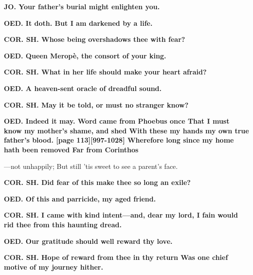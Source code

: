 \documentclass[11pt,letter]{book}
\begin{document}
\par \textbf{JO. Your father’s burial might enlighten you.}
\par 

\par \textbf{OED. It doth. But I am darkened by a life.}
\par 

\par \textbf{COR. SH. Whose being overshadows thee with fear?}
\par 

\par \textbf{OED. Queen Meropè, the consort of your king.}
\par 

\par \textbf{COR. SH. What in her life should make your heart afraid?}
\par 

\par \textbf{OED. A heaven-sent oracle of dreadful sound.}
\par 

\par \textbf{COR. SH. May it be told, or must no stranger know?}
\par 

\par \textbf{OED. Indeed it may. Word came from Phoebus once That I must know my mother’s shame, and shed With these my hands my own true father’s blood. [page 113][997-1028] Wherefore long since my home hath been removed Far from Corinthos}
\par  —not unhappily; But still ’tis sweet to see a parent’s face.

\par \textbf{COR. SH. Did fear of this make thee so long an exile?}
\par 

\par \textbf{OED. Of this and parricide, my aged friend.}
\par 

\par \textbf{COR. SH. I came with kind intent—and, dear my lord, I fain would rid thee from this haunting dread.}
\par 

\par \textbf{OED. Our gratitude should well reward thy love.}
\par 

\par \textbf{COR. SH. Hope of reward from thee in thy return Was one chief motive of my journey hither.}
\par 
\end{document}
